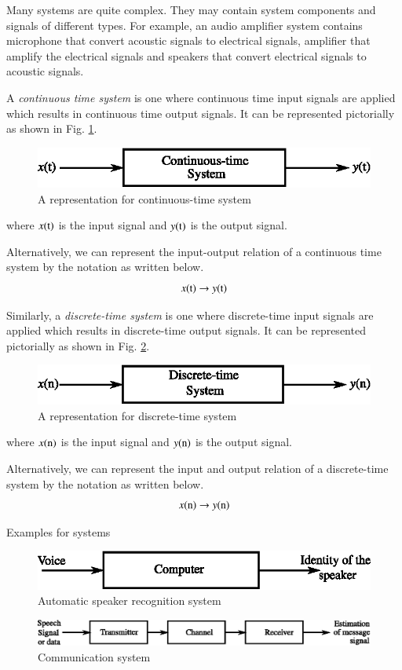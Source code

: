Many systems are quite complex. They may contain system components and signals of different types. For example, an audio amplifier system contains microphone that convert acoustic signals to electrical signals, amplifier that amplify the electrical signals and speakers that convert electrical signals to acoustic signals.

A {\em continuous time system} is one where continuous time input signals are applied which results in continuous time output signals. It can be represented pictorially as shown in Fig. \ref{chap1-fig1.3}.
\begin{figure}[H]
\centering
\includegraphics{src/chap1/fig4.eps}
\caption{A representation for continuous-time system}\label{chap1-fig1.3}
\end{figure}
where $x(\textrm{t})$ is the input signal and $y(\textrm{t})$ is the output signal.

Alternatively, we can represent the input-output relation of a continuous time system by the notation as written below.
$$
x(\textrm{t})\to y(\textrm{t})
$$

Similarly, a {\em discrete-time system} is one where discrete-time input signals are applied which results in discrete-time output signals. It can be represented pictorially as shown in Fig. \ref{chap1-fig1.4}.
\begin{figure}[H]
\centering
\includegraphics{src/chap1/fig5.eps}
\caption{A representation for discrete-time system}\label{chap1-fig1.4}
\end{figure}
where $x(\textrm{n})$ is the input signal and $y(\textrm{n})$ is the output signal.

Alternatively, we can represent the input and output relation of a discrete-time system by the notation as written below.
$$
x(\textrm{n})\to y(\textrm{n})
$$

Examples for systems
\begin{figure}[H]
\centering
\includegraphics{src/chap1/fig6.eps}
\caption{Automatic speaker recognition system}\label{chap1-fig1.5}
\end{figure}
\begin{figure}[H]
\centering
\includegraphics{src/chap1/fig7.eps}
\caption{Communication system}\label{chap1-fig1.6}
\end{figure}

